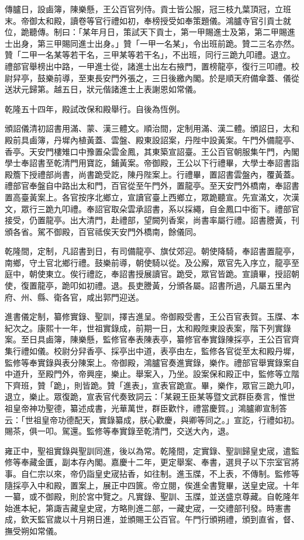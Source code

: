 \begin{pinyinscope}
傳臚日，設鹵簿，陳樂懸，王公百官列侍。貢士皆公服，冠三枝九葉頂冠，立班末。帝御太和殿，讀卷等官行禮如初，奉榜授受如奉策題儀。鴻臚寺官引貢士就位，跪聽傳。制曰：「某年月日，策試天下貢士，第一甲賜進士及第，第二甲賜進士出身，第三甲賜同進士出身。」贊「一甲一名某」，令出班前跪。贊二三名亦然。贊「二甲一名某等若干名，三甲某等若干名」，不出班，同行三跪九叩禮。退立。禮部官舉榜出中路，一甲進士從，諸進士出左右掖門，置榜龍亭，復行三叩禮。校尉舁亭，鼓樂前導，至東長安門外張之，三日後繳內閣。於是順天府備傘蓋、儀從送狀元歸第。越五日，狀元偕諸進士上表謝恩如常儀。

乾隆五十四年，殿試改保和殿舉行。自後為恆例。

頒詔儀清初詔書用滿、蒙、漢三體文。順治間，定制用滿、漢二體。頒詔日，太和殿前具鹵簿，丹墀內植黃蓋、雲盤、殿東設詔案，丹陛中設黃案。午門外備龍亭、香亭。天安門樓雉口中豫置朵雲金鳳，其東築宣詔臺。王公百官朝服集午門，內閣學士奉詔書至乾清門用寶訖，鋪黃案。帝御殿，王公以下行禮畢，大學士奉詔書詣殿簷下授禮部尚書，尚書跪受訖，陳丹陛案上。行禮畢，置詔書雲盤內，覆黃蓋。禮部官奉盤自中路出太和門，百官從至午門外，置龍亭。至天安門外橋南，奉詔書置高臺黃案上。各官按序北鄉立，宣讀官臺上西鄉立，眾跪聽宣。先宣滿文，次漢文，眾行三跪九叩禮。奉詔官取朵雲承詔書，系以採繩，自金鳳口中銜下。禮部官接受，仍置龍亭。出大清門，赴禮部，望闕列香案，尚書率屬行禮。詔書謄黃，刊頒各省。駕不御殿，百官祗俟天安門外橋南，餘儀同。

乾隆間，定制，凡詔書到日，有司備龍亭、旗仗郊迎。朝使降騎，奉詔書置龍亭，南鄉，守土官北鄉行禮。鼓樂前導，朝使騎以從。及公廨，眾官先入序立，龍亭至庭中，朝使東立。俟行禮訖，奉詔書授展讀官。跪受，眾官皆跪。宣讀畢，授詔朝使，復置龍亭，跪叩如初禮。退。長吏謄黃，分頒各屬。詔書所過，凡屬五里內府、州、縣、衛各官，咸出郭門迎送。

進書儀定制，纂修實錄、聖訓，擇吉進呈。帝御殿受書，王公百官表賀。玉牒、本紀次之。康熙十一年，世祖實錄成，前期一日，太和殿陛東設表案，階下列實錄案。至日具鹵簿，陳樂懸，監修官奉表陳表亭，纂修官奉實錄陳採亭，王公百官齊集行禮如儀。校尉分舁香亭、採亭出中道，表亭由左，監修各官從至太和殿丹墀，監修等奉實錄與表分陳案上。帝御殿，鴻臚官奏進實錄，樂作。禮部官舉實錄案自中道升，至殿門外，帝興座，樂止。舉案入，乃坐。設案保和殿正中，監修等立階下齊班，贊「跪」，則皆跪。贊「進表」，宣表官跪宣。畢，樂作，眾官三跪九叩，退立，樂止。眾復跪，宣表官代奏致詞云：「某親王臣某等暨文武群臣奏言，惟世祖皇帝神功聖德，纂述成書，光華萬世，群臣歡忭，禮當慶賀。」鴻臚卿宣制答云：「世祖皇帝功德配天，實錄纂成，朕心歡慶，與卿等同之。」宣訖，行禮如初。賜茶，俱一叩。駕還。監修等奉實錄至乾清門，交送大內，退。

雍正中，聖祖實錄與聖訓同進，後以為常。乾隆間，定實錄、聖訓歸皇史宬，遣監修等奉藏金匱，副本存內閣。嘉慶十二年，更定舉案、奉書，選貝子以下宗室官將事。自仁宗以來，帝仍詣皇史宬拈香，如往制。進玉牒，不上表，不傳制。監修等隨採亭入中和殿，置案上，展正中四篋。帝立閱，俟進全書覽畢，送皇史宬。十年一纂，或不御殿，則於宮中覽之。凡實錄、聖訓、玉牒，並送盛京尊藏。自乾隆年始進本紀，第諏吉藏皇史宬，方略則進二部，一藏史宬，一交禮部刊發。時憲書成，欽天監官歲以十月朔日進，並頒賜王公百官。午門行頒朔禮，頒到直省，督、撫受朔如常儀。


\end{pinyinscope}
